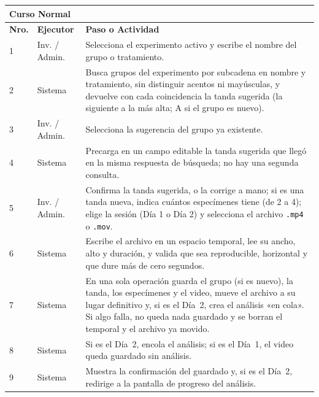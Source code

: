\noindent
\begin{tabular}{|p{1.0cm}|p{3.7cm}|p{9.5cm}|}
\hline
\multicolumn{3}{|l|}{\textbf{Curso Normal}} \\
\hline
\textbf{Nro.} & \textbf{Ejecutor} & \textbf{Paso o Actividad} \\
\hline
1 & Inv. / Admin. & Selecciona el experimento activo y escribe el nombre del grupo o tratamiento. \\
\hline
2 & Sistema & Busca grupos del experimento por subcadena en nombre y tratamiento, sin distinguir acentos ni mayúsculas, y devuelve con cada coincidencia la tanda sugerida (la siguiente a la más alta; A si el grupo es nuevo). \\
\hline
3 & Inv. / Admin. & Selecciona la sugerencia del grupo ya existente. \\
\hline
4 & Sistema & Precarga en un campo editable la tanda sugerida que llegó en la misma respuesta de búsqueda; no hay una segunda consulta. \\
\hline
5 & Inv. / Admin. & Confirma la tanda sugerida, o la corrige a mano; si es una tanda nueva, indica cuántos especímenes tiene (de 2 a 4); elige la sesión (Día 1 o Día 2) y selecciona el archivo \texttt{.mp4} o \texttt{.mov}. \\
\hline
6 & Sistema & Escribe el archivo en un espacio temporal, lee su ancho, alto y duración, y valida que sea reproducible, horizontal y que dure más de cero segundos. \\
\hline
7 & Sistema & En una sola operación guarda el grupo (si es nuevo), la tanda, los especímenes y el video, mueve el archivo a su lugar definitivo y, si es el Día~2, crea el análisis «en cola». Si algo falla, no queda nada guardado y se borran el temporal y el archivo ya movido. \\
\hline
8 & Sistema & Si es el Día~2, encola el análisis; si es el Día~1, el video queda guardado sin análisis. \\
\hline
9 & Sistema & Muestra la confirmación del guardado y, si es el Día~2, redirige a la pantalla de progreso del análisis. \\
\hline
\end{tabular}


